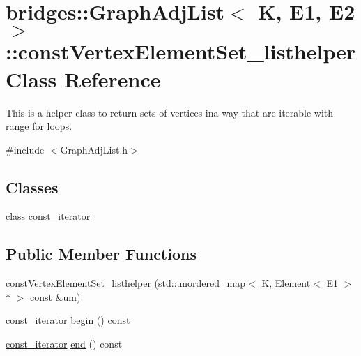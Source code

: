 \hypertarget{classbridges_1_1_graph_adj_list_1_1const_vertex_element_set__listhelper}{}\section{bridges\+::Graph\+Adj\+List$<$ K, E1, E2 $>$\+::const\+Vertex\+Element\+Set\+\_\+listhelper Class Reference}
\label{classbridges_1_1_graph_adj_list_1_1const_vertex_element_set__listhelper}


This is a helper class to return sets of vertices ina way that are iterable with range for loops.  




{\ttfamily \#include $<$Graph\+Adj\+List.\+h$>$}

\subsection*{Classes}
\begin{DoxyCompactItemize}
\item 
class \mbox{\hyperlink{classbridges_1_1_graph_adj_list_1_1const_vertex_element_set__listhelper_1_1const__iterator}{const\+\_\+iterator}}
\end{DoxyCompactItemize}
\subsection*{Public Member Functions}
\begin{DoxyCompactItemize}
\item 
\mbox{\hyperlink{classbridges_1_1_graph_adj_list_1_1const_vertex_element_set__listhelper_abfaf469c4ba34510664745aa57ab81b5}{const\+Vertex\+Element\+Set\+\_\+listhelper}} (std\+::unordered\+\_\+map$<$ \mbox{\hyperlink{namespacebridges_acfb0a4f7877d8f63de3e6862004c50edaa5f3c6a11b03839d46af9fb43c97c188}{K}}, \mbox{\hyperlink{classbridges_1_1_element}{Element}}$<$ E1 $>$ $\ast$ $>$ const \&um)
\item 
\mbox{\hyperlink{classbridges_1_1_graph_adj_list_1_1const_vertex_element_set__listhelper_1_1const__iterator}{const\+\_\+iterator}} \mbox{\hyperlink{classbridges_1_1_graph_adj_list_1_1const_vertex_element_set__listhelper_a006c4ee341ba478ea8f22c485a2c099d}{begin}} () const
\item 
\mbox{\hyperlink{classbridges_1_1_graph_adj_list_1_1const_vertex_element_set__listhelper_1_1const__iterator}{const\+\_\+iterator}} \mbox{\hyperlink{classbridges_1_1_graph_adj_list_1_1const_vertex_element_set__listhelper_a899b6c2765f09fd4e238cfaf869de667}{end}} () const
\end{DoxyCompactItemize}


